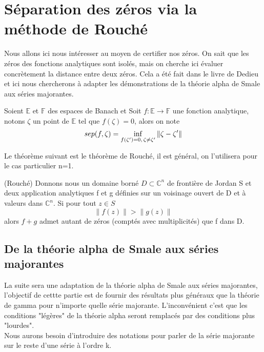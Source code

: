 \documentclass[a4paper,10.5pt]{article}
\begin{document}
	
	
	\section{Séparation des zéros via la méthode de Rouché}
	Nous allons ici nous intéresser au moyen de certifier nos zéros. On sait que les zéros des fonctions analytiques sont isolés, mais on cherche ici évaluer concrètement la distance entre deux zéros. Cela a été fait dans le livre de Dedieu et ici nous chercherons à adapter les démonstrations de la théorie alpha de Smale aux séries majorantes.
	
	\begin{definition} Soient $\mathbb{E}$ et $\mathbb{F}$ des espaces de Banach et 
		Soit $f:\mathbb{E}\rightarrow \mathbb{F}$ une fonction analytique, notons $\zeta$ un point de $\mathbb{E}$ tel que $f(\zeta)=0$, alors on note
		\begin{equation}
		 sep(f,\zeta)=\inf_{f(\zeta ')=0, \hspace{0.5mm} \zeta \neq \zeta '}\left\|\zeta-\zeta '\right\|
		\end{equation}
		
	\end{definition}
	Le théorème suivant est le théorème de Rouché, il est général, on l'utilisera pour le cas particulier n=1.

	\begin{theorem}(Rouché) Donnons nous un domaine borné $D \subset \mathbb{C}^{n}$ de frontière de Jordan S et deux application analytiques f et g définies sur un voisinage ouvert de D et à valeurs dans $\mathbb{C}^n$. Si pour tout $z \in S$ 
	\[\left\|f(z)\right\|>\left\|g(z)\right\|\]
	alors $f+g$ admet autant de zéros (comptés avec multiplicités) que f dans D.
	\end{theorem}
	
	
	\subsection{De la théorie alpha de Smale aux séries majorantes}
	
	La suite sera une adaptation de la théorie alpha de Smale aux séries majorantes, l'objectif de cettte partie est de fournir des résultats plus généraux que la théorie de gamma pour n'importe quelle série majorante. L'inconvénient c'est que les conditions "légères" de la théorie alpha seront remplacés par des conditions plus "lourdes". \cite{dedieu2006points}\\
	Nous aurons besoin d'introduire des notations pour parler de la série majorante sur le reste d'une série à l'ordre k.
	
\end{document}
